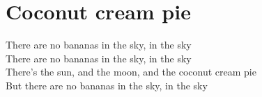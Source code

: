 \section{Coconut cream pie}
There are no bananas in the sky, in the sky\\
There are no bananas in the sky, in the sky\\
There’s the sun, and the moon, and the coconut cream pie\\
But there are no bananas in the sky, in the sky